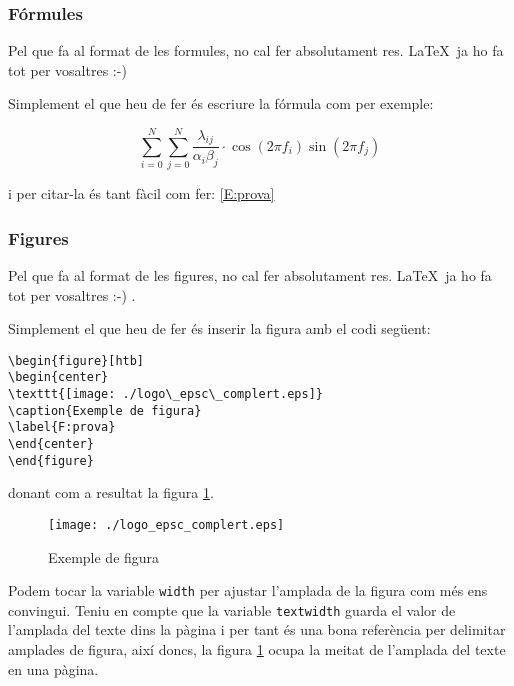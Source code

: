\subsubsection{Fórmules}

Pel que fa al format de les formules, no cal fer absolutament res. \LaTeX \ ja ho fa tot per vosaltres :-)  

Simplement el que heu de fer és escriure la fórmula com per exemple:

\begin{equation}\label{E:prova}
\sum _{i=0}^{N} \sum _{j=0}^{N} \frac{\lambda _{ij}}{\alpha _i \beta_ j} \cdot \cos (2\pi f_i) \sin(2 \pi f_j)
\end{equation}

i per citar-la és tant fàcil com fer: \ref{E:prova}

\subsubsection{Figures}

Pel que fa al format de les figures, no cal fer absolutament res. \LaTeX \ ja ho fa tot per vosaltres :-) . 

Simplement el que heu de fer és inserir la figura amb el codi següent:

\begin{verbatim}
\begin{figure}[htb]
\begin{center}
\texttt{[image: ./logo\_epsc\_complert.eps]}
\caption{Exemple de figura}
\label{F:prova}
\end{center}
\end{figure}
\end{verbatim}

donant com a resultat la figura \ref{F:prova}.

\begin{figure}[htb]
\begin{center}
\texttt{[image: ./logo\_epsc\_complert.eps]}
\caption{Exemple de figura}
\label{F:prova}
\end{center}
\end{figure}

Podem tocar la variable \texttt{width} per ajustar l'amplada de la figura com més ens convingui. Teniu en compte que la variable \texttt{textwidth} guarda el valor de l'amplada del texte dins la pàgina i per tant és una bona referència per delimitar amplades de figura, així doncs, la figura \ref{F:prova} ocupa la meitat de l'amplada del texte en una pàgina. 


